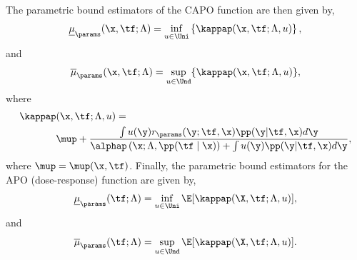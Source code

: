 The parametric bound estimators of the CAPO function are then given by,
\begin{equation*}
    \underline{\mu}_{\params}(\x, \tf; \Lambda) = \inf_{u \in \Uni} \left\{ \kappap(\x, \tf; \Lambda, u) \right\},
\end{equation*}
and
\begin{equation*}
    \overline{\mu}_{\params}(\x, \tf; \Lambda) = \sup_{u \in \Und} \{ \kappap(\x, \tf; \Lambda, u) \},
\end{equation*}
where
\begin{equation}
    \begin{split}
        \kappap&(\x, \tf; \Lambda, u) = \\
        &\mup + 
        \frac{\int u(\y) r_{\params}(\y; \tf, \x) \pp(\y | \tf, \x)d\y}
        {\alphap\left(\x; \Lambda, \pp(\tf \mid \x)\right) + \int u(\y)\pp(\y | \tf, \x)d\y},
    \end{split}
    \label{eq:kappap}
\end{equation}
where $\mup=\mup(\x, \tf)$.
Finally, the parametric bound estimators for the APO (dose-response) function are given by,
\begin{equation}
    \underline{\mu}_{\params}(\tf; \Lambda) = \inf_{u \in \Uni}  \E[\kappap(\X, \tf; \Lambda, u)],
\end{equation}
and
\begin{equation}
    \overline{\mu}_{\params}(\tf; \Lambda) = \sup_{u \in \Und} \E[\kappap(\X, \tf; \Lambda, u)].
\end{equation}
